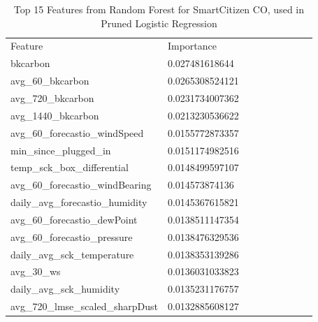 \begin{table}[H]
\centering
\begin{tabular}{lllllllll}
\\
\\
\toprule
Feature & Importance \\
\midrule
bkcarbon &  0.027481618644 \\
avg\_60\_bkcarbon &  0.0265308524121 \\
avg\_720\_bkcarbon &  0.0231734007362 \\
avg\_1440\_bkcarbon &  0.0213230536622 \\
avg\_60\_forecastio\_windSpeed &  0.0155772873357 \\
min\_since\_plugged\_in &  0.0151174982516 \\
temp\_sck\_box\_differential &  0.0148499597107 \\
avg\_60\_forecastio\_windBearing &  0.014573874136 \\
daily\_avg\_forecastio\_humidity &  0.0145367615821 \\
avg\_60\_forecastio\_dewPoint &  0.0138511147354 \\
avg\_60\_forecastio\_pressure &  0.0138476329536 \\
daily\_avg\_sck\_temperature &  0.0138353139286 \\
avg\_30\_ws &  0.0136031033823 \\
daily\_avg\_sck\_humidity &  0.0135231176757 \\
avg\_720\_lmse\_scaled\_sharpDust &  0.0132885608127 \\
\bottomrule
\end{tabular}
\label{tab:as1_co_randomforest_features}
\caption{Top 15 Features from Random Forest for SmartCitizen CO, used in Pruned Logistic Regression}
\end{table}



